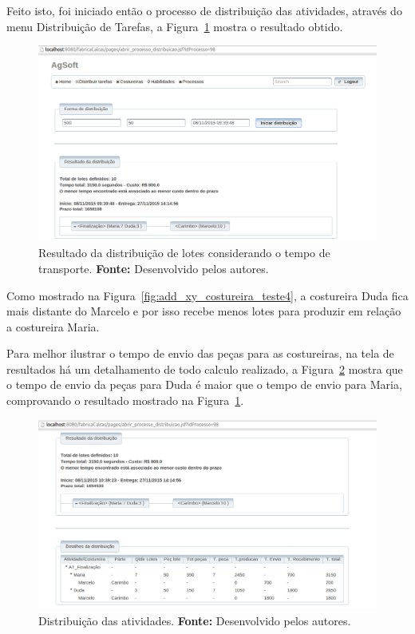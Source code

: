 \par Feito isto, foi iniciado então o processo de distribuição das atividades,
através do menu Distribuição de Tarefas, a Figura~\ref{fig:resultado_transporte_teste4} mostra o resultado obtido.


\begin{figure}[h!]
	\centerline{\includegraphics[scale=0.3]{./imagens/resultado_transporte_teste4.png}}
	\caption[Resultado da disttribuição de lotes considerando o tempo de transporte.]
	{Resultado da distribuição de lotes considerando o tempo de transporte. \textbf{Fonte:} Desenvolvido pelos
	autores.}
	\label{fig:resultado_transporte_teste4}
\end{figure}

\par Como mostrado na Figura~\ref{fig:add_xy_costureira_teste4}, a costureira
Duda fica mais distante do Marcelo e por isso recebe menos lotes para produzir em
relação a costureira Maria.

\par Para melhor ilustrar o tempo de envio das peças para as costureiras, na tela
de resultados há um detalhamento de todo calculo realizado, a Figura~\ref{fig:detalhameneto_transporte_teste4} 
mostra que o tempo de envio da peças para Duda é 
maior que o tempo de envio para Maria, comprovando o resultado mostrado na
Figura~\ref{fig:resultado_transporte_teste4}.

\begin{figure}[h!]
	\centerline{\includegraphics[scale=0.3]{./imagens/detalhamento_transporte_teste4.png}}
	\caption[Distribuição das atividades.] 
	{Distribuição das atividades. \textbf{Fonte:} Desenvolvido pelos autores.}
	\label{fig:detalhameneto_transporte_teste4}
\end{figure}

